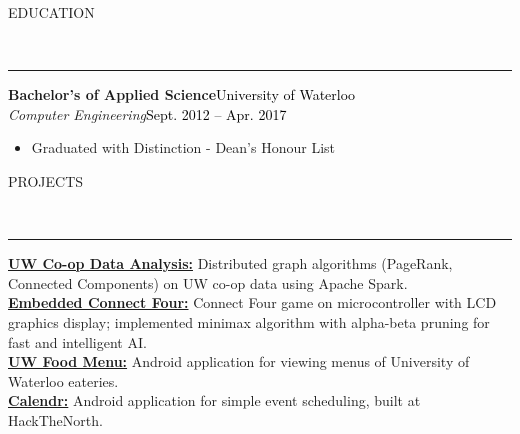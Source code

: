 \documentclass[11pt, letterpaper, oneside]{article}
\newcommand{\HRule}[2]{\textcolor{#1}{\rule{\linewidth}{#2}}}
\newcommand{\sectiontitle}[1]{\begin{minipage}{\textwidth}\vspace{-7.5pt}\begin{flushleft}\hspace{-20.5pt}\vspace{-25pt}
\Large\MakeUppercase{#1}\end{flushleft}\end{minipage}\\\HRule{black}{0.15mm}\vspace{\baselineskip}}
\newenvironment{ressection}[1]{
  \sectiontitle{#1}}
  {\vspace{-\baselineskip}}
\newcommand{\resentryheader}[4]{
    \vspace{-6pt}
    \textbf{#1}\hspace{\stretch{1}}\textcolor{black}{#3}\\
    \textit{#2}\hspace{\stretch{1}}\textcolor{black}{#4}\\
}
\newcommand{\resitem}[1]{
    \vspace{2pt}
    \item \begin{flushleft} #1 \end{flushleft}
}
\newenvironment{resentry}[4]{
  \begin{minipage}{\textwidth}
  \vspace{-3pt}
    \resentryheader{#1}{#2}{#3}{#4}
        \vspace{-\baselineskip}
    \begin{itemize}[noitemsep,nolistsep]
}{
    \end{itemize}
        \vspace{\baselineskip}
        \end{minipage}
}
\begin{document}
\vspace{4pt}

\begin{ressection}{Education}
\begin{resentry}{Bachelor's of Applied Science}{Computer Engineering}{University of Waterloo}{Sept. 2012 -- Apr. 2017}
    \resitem{Graduated with Distinction - Dean's Honour List} \hspace{-15pt}
  \end{resentry}  
\end{ressection}

\begin{ressection}{Projects}\vspace{-12pt}
  \href{https://github.com/coreywu/CoopStatsDataAnalysis}{\textbf{UW Co-op Data Analysis:}} Distributed graph algorithms (PageRank, Connected Components) on UW co-op data using Apache Spark. \vspace{4pt} \\
  \href{https://github.com/coreywu/Connect4}{\textbf{Embedded Connect Four:}} Connect Four game on microcontroller with LCD graphics display; implemented minimax algorithm with alpha-beta pruning for fast and intelligent AI.\vspace{4pt} \\
  \href{https://play.google.com/store/apps/details?id=ca.uwaterloo.uwfoodservices&hl=en}{\textbf{UW Food Menu:}} Android application for viewing menus of University of Waterloo eateries.\vspace{4pt} \\
   \href{http://devpost.com/software/calendr-wq4uf}{\textbf{Calendr:}} Android application for simple event scheduling, built at HackTheNorth.
  \vspace{8pt}\\\hspace{-20pt}
\end{ressection}
\end{document}
